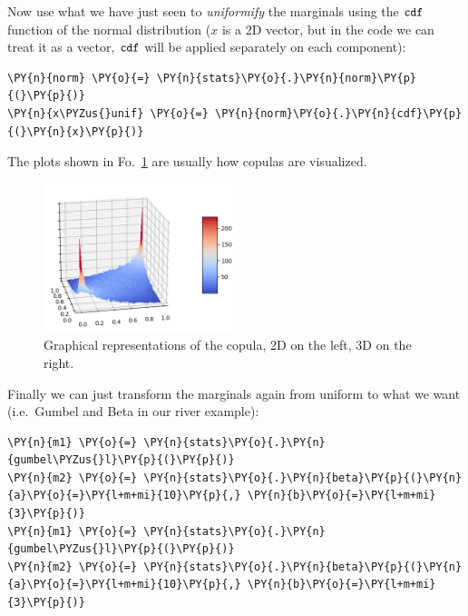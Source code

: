     Now use what we have just seen to \emph{uniformify} the marginals using
the \(\tt{cdf}\) function of the normal distribution (\(x\) is a 2D
vector, but in the code we can treat it as a vector, \(\tt{cdf}\) will
be applied separately on each component):

\begin{tcolorbox}[breakable, size=fbox, boxrule=1pt, pad at break*=1mm,colback=cellbackground, colframe=cellborder]
\begin{Verbatim}[commandchars=\\\{\}]
\PY{n}{norm} \PY{o}{=} \PY{n}{stats}\PY{o}{.}\PY{n}{norm}\PY{p}{(}\PY{p}{)}
\PY{n}{x\PYZus{}unif} \PY{o}{=} \PY{n}{norm}\PY{o}{.}\PY{n}{cdf}\PY{p}{(}\PY{n}{x}\PY{p}{)}
\end{Verbatim}
\end{tcolorbox}

The plots shown in Fo.~\ref{fig:copula} are usually how copulas are visualized.

    \begin{figure}
    \centering
    \quad
    \includegraphics[width=0.5\textwidth]{copula_3d.png}
    \caption{Graphical representations of the copula, 2D on the left, 3D on the right.}
    \label{fig:copula}
    \end{figure}

Finally we can just transform the marginals again from uniform to what we want
(i.e.~Gumbel and Beta in our river example):

\begin{tcolorbox}[breakable, size=fbox, boxrule=1pt, pad at break*=1mm,colback=cellbackground, colframe=cellborder]
\begin{Verbatim}[commandchars=\\\{\}]
\PY{n}{m1} \PY{o}{=} \PY{n}{stats}\PY{o}{.}\PY{n}{gumbel\PYZus{}l}\PY{p}{(}\PY{p}{)}
\PY{n}{m2} \PY{o}{=} \PY{n}{stats}\PY{o}{.}\PY{n}{beta}\PY{p}{(}\PY{n}{a}\PY{o}{=}\PY{l+m+mi}{10}\PY{p}{,} \PY{n}{b}\PY{o}{=}\PY{l+m+mi}{3}\PY{p}{)}
\PY{n}{m1} \PY{o}{=} \PY{n}{stats}\PY{o}{.}\PY{n}{gumbel\PYZus{}l}\PY{p}{(}\PY{p}{)}
\PY{n}{m2} \PY{o}{=} \PY{n}{stats}\PY{o}{.}\PY{n}{beta}\PY{p}{(}\PY{n}{a}\PY{o}{=}\PY{l+m+mi}{10}\PY{p}{,} \PY{n}{b}\PY{o}{=}\PY{l+m+mi}{3}\PY{p}{)}
\end{Verbatim}
\end{tcolorbox}

